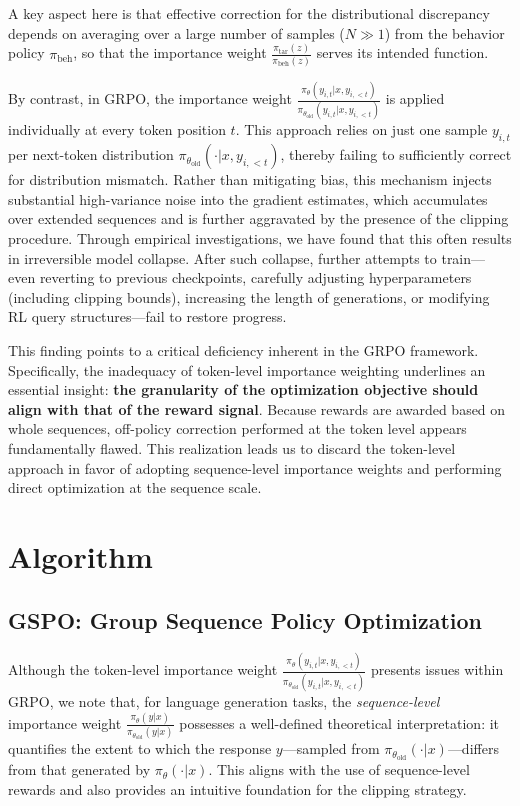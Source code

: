 A key aspect here is that effective correction for the distributional discrepancy depends on averaging over a large number of samples ($N \gg 1$) from the behavior policy $\pi_\text{beh}$, so that the importance weight $\frac{ \pi_\text{tar} (z) }{ \pi_\text{beh} (z)}$ serves its intended function.

By contrast, in GRPO, the importance weight $\frac{ \pi_{\theta} (y_{i,t} | x, y_{i,<t}) }{ \pi_{\theta_\text{old}} (y_{i,t} | x,y_{i,<t})}$ is applied individually at every token position $t$. This approach relies on just one sample $y_{i,t}$ per next-token distribution $\pi_{\theta_\text{old}}( \cdot | x, y_{i, <t})$, thereby failing to sufficiently correct for distribution mismatch. Rather than mitigating bias, this mechanism injects substantial high-variance noise into the gradient estimates, which accumulates over extended sequences and is further aggravated by the presence of the clipping procedure. Through empirical investigations, we have found that this often results in irreversible model collapse. After such collapse, further attempts to train—even reverting to previous checkpoints, carefully adjusting hyperparameters (including clipping bounds), increasing the length of generations, or modifying RL query structures—fail to restore progress.

This finding points to a critical deficiency inherent in the GRPO framework. Specifically, the inadequacy of token-level importance weighting underlines an essential insight: \textbf{the granularity of the optimization objective should align with that of the reward signal}. Because rewards are awarded based on whole sequences, off-policy correction performed at the token level appears fundamentally flawed. This realization leads us to discard the token-level approach in favor of adopting sequence-level importance weights and performing direct optimization at the sequence scale.

\section{Algorithm}

\subsection{GSPO: Group Sequence Policy Optimization}

Although the token-level importance weight $\frac{ \pi_{\theta} (y_{i,t} | x, y_{i,<t}) }{ \pi_{\theta_\text{old}} (y_{i,t} | x,y_{i,<t})}$ presents issues within GRPO, we note that, for language generation tasks, the \textit{sequence-level} importance weight $\frac{ \pi_{\theta} (y | x) }{ \pi_{\theta_\text{old}} (y | x)}$ possesses a well-defined theoretical interpretation: it quantifies the extent to which the response $y$—sampled from $\pi_{\theta_\text{old}} (\cdot | x)$—differs from that generated by $\pi_{\theta} (\cdot | x)$. This aligns with the use of sequence-level rewards and also provides an intuitive foundation for the clipping strategy.

